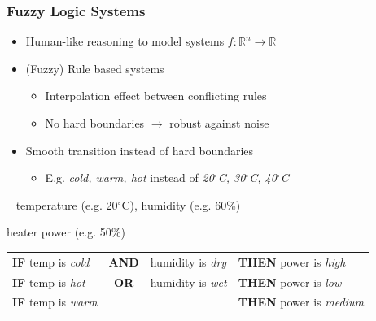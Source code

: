 \documentclass[
	10pt,
	t		%
]{beamer}
\begin{document}
\begin{frame}
	\frametitle{Fuzzy Logic Systems}

	\begin{itemize}
		\item Human-like reasoning to model systems $f: \mathbb{R}^n \rightarrow \mathbb{R}$
		\item (Fuzzy) Rule based systems
		      \begin{itemize}
			      \item Interpolation effect between conflicting rules
			      \item No hard boundaries $\rightarrow$ robust against noise
		      \end{itemize}
		\item Smooth transition instead of hard boundaries
		      \begin{itemize}
			      \item E.g. \textit{cold, warm, hot} instead of \textit{20$^{\circ}$C, 30$^{\circ}$C, 40$^{\circ}$C}
		      \end{itemize}
	\end{itemize}

	\vspace{0.4cm}

	\begin{example}[Heater Control]

		\begin{description}[wide=0]
			\item[\textbf{Input:}  ] ~ temperature (e.g. 20$^{\circ}$C), humidity (e.g. 60\%)
			\item[\textbf{Output:}] heater power (e.g. 50\%)
			\item[\textbf{Rules:}]
			      {\footnotesize
			      \begin{tabular}{lcll}
				      \textbf{IF}  temp is \textit{cold} & \textbf{AND} & humidity is \textit{dry} & \textbf{THEN}  power is \textit{high}   \\
				      \textbf{IF}  temp is \textit{hot}  & \textbf{OR}  & humidity is \textit{wet} & \textbf{THEN}  power is \textit{low}    \\
				      \textbf{IF}  temp is \textit{warm} &              &                          & \textbf{THEN}  power is \textit{medium} \\
			      \end{tabular} }
		\end{description}
	\end{example}

\end{frame}
\end{document}
